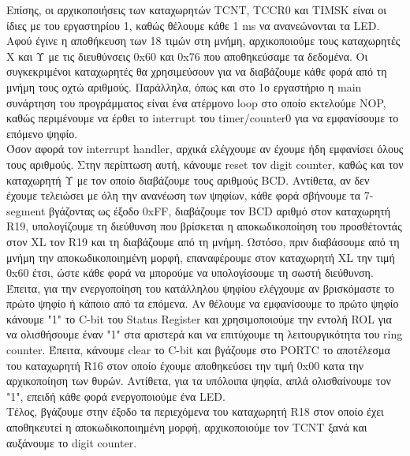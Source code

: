 \documentclass{article}
\begin{document}
	\noindent
	Επίσης, οι αρχικοποιήσεις των καταχωρητών TCNT, TCCR0 και TIMSK είναι οι ίδιες με του εργαστηρίου 1, καθώς θἐλουμε κάθε 1 ms να ανανεώνονται τα LED. Αφού έγινε η αποθήκευση των 18 τιμών στη μνήμη, αρχικοποιούμε τους καταχωρητές Χ και Υ με τις διευθύνσεις 0x60 και 0x76 που αποθηκεύσαμε τα δεδομένα. Οι συγκεκριμένοι καταχωρητές θα χρησιμεύσουν για να διαβάζουμε κάθε φορά από τη μνήμη τους οχτώ αριθμούς. Παράλληλα, όπως και στο 1ο εργαστήριο η main συνάρτηση του προγράμματος είναι ένα ατέρμονο loop στο οποίο εκτελούμε NOP, καθώς περιμένουμε να έρθει το interrupt του timer/counter0 για να εμφανίσουμε το επόμενο ψηφίο. \\
	
	\noindent
	Όσον αφορά τον interrupt handler, αρχικά ελέγχουμε αν έχουμε ήδη εμφανίσει όλους τους αριθμούς. Στην περίπτωση αυτή, κάνουμε reset τον digit counter, καθώς και τον καταχωρητή Υ με τον οποίο διαβάζουμε τους αριθμούς BCD. Aντίθετα, αν δεν έχουμε τελειώσει με όλη την ανανέωση των ψηφίων, κάθε φορά σβήνουμε τα 7-segment βγάζοντας ως έξοδο 0xFF, διαβάζουμε τον BCD αριθμό στον καταχωρητή R19, υπολογίζουμε τη διεύθυνση που βρίσκεται η αποκωδικοποίηση του προσθέτοντάς στον ΧL τον R19 και τη διαβάζουμε από τη μνήμη. Ωστόσο, πριν διαβάσουμε από τη μνήμη την αποκωδικοποιημένη μορφή, επαναφέρουμε στον καταχωρητή ΧL την τιμή 0x60 έτσι, ώστε κάθε φορά να μπορούμε να υπολογίσουμε τη σωστή διεύθυνση.\\
	
	\noindent
	Έπειτα, για την ενεργοποίηση του κατάλληλου ψηφίου ελέγχουμε αν βρισκόμαστε το πρώτο ψηφίο ή κάποιο από τα επόμενα. Aν θέλουμε να εμφανίσουμε το πρώτο ψηφίο κάνουμε "1" το C-bit του Status Register και χρησιμοποιούμε την εντολή ROL για να ολισθήσουμε έναν "1" στα αριστερά και να επιτύχουμε τη λειτουργικότητα του ring counter. Έπειτα, κάνουμε clear το C-bit και βγάζουμε στο PORTC το αποτέλεσμα του καταχωρητή R16 στον οποίο έχουμε αποθηκεύσει την τιμή 0x00 κατα την αρχικοποίηση των θυρών. Αντίθετα, για τα υπόλοιπα ψηφία, απλά ολισθαίνουμε τον "1", επειδή κάθε φορά ενεργοποιούμε ένα LED.\\
	
	\noindent
	Tέλος, βγάζουμε στην έξοδο τα περιεχόμενα του καταχωρητή R18 στον οποίο έχει αποθηκευτεί η αποκωδικοποιημένη μορφή, αρχικοποιούμε τον TCNT ξανά και αυξάνουμε το digit counter.
	
\end{document}
